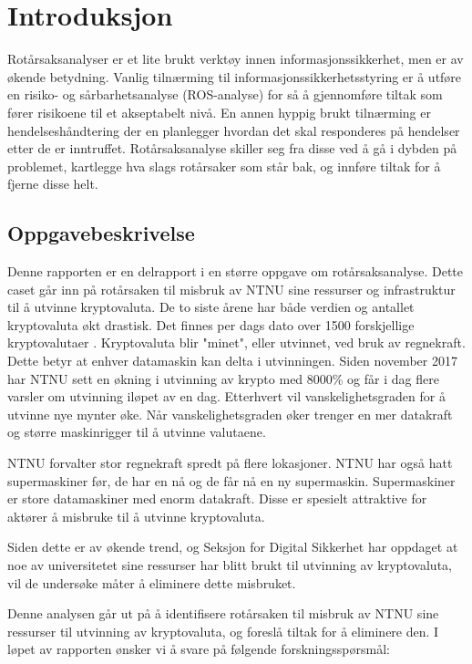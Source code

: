 \chapter{Introduksjon}
Rotårsaksanalyser er et lite brukt verktøy innen informasjonssikkerhet, men er av økende betydning. Vanlig tilnærming til informasjonssikkerhetsstyring er å utføre en risiko- og sårbarhetsanalyse (ROS-analyse) for så å gjennomføre tiltak som fører risikoene til et akseptabelt nivå. En annen hyppig brukt tilnærming er hendelseshåndtering der en planlegger hvordan det skal responderes på hendelser etter de er inntruffet. Rotårsaksanalyse skiller seg fra disse ved å gå i dybden på problemet, kartlegge hva slags rotårsaker som står bak, og innføre tiltak for å fjerne disse helt.

\section{Oppgavebeskrivelse}
Denne rapporten er en delrapport i en større oppgave om rotårsaksanalyse. Dette caset går inn på rotårsaken til misbruk av NTNU sine ressurser og infrastruktur til å utvinne kryptovaluta. De to siste årene har både verdien og antallet kryptovaluta økt drastisk. Det finnes per dags dato over 1500 forskjellige kryptovalutaer \cite{Cryptocurrency}. Kryptovaluta blir "minet", eller utvinnet, ved bruk av regnekraft. Dette betyr at enhver datamaskin kan delta i utvinningen. Siden november 2017 har NTNU sett en økning i utvinning av krypto med 8000\% og får i dag flere varsler om utvinning iløpet av en dag.  Etterhvert vil vanskelighetsgraden for å utvinne nye mynter øke. Når vanskelighetsgraden øker trenger en mer datakraft og større maskinrigger til å utvinne valutaene. 

NTNU forvalter stor regnekraft spredt på flere lokasjoner. NTNU har også hatt supermaskiner før, de har en nå og de får nå en ny supermaskin. Supermaskiner er store datamaskiner med enorm datakraft. Disse er spesielt attraktive for aktører å misbruke til å utvinne kryptovaluta. 

Siden dette er av økende trend, og Seksjon for Digital Sikkerhet har oppdaget at noe av universitetet sine ressurser har blitt brukt til utvinning av kryptovaluta, vil de undersøke måter å eliminere dette misbruket. 

Denne analysen går ut på å identifisere rotårsaken til misbruk av NTNU sine ressurser til utvinning av kryptovaluta, og foreslå tiltak for å eliminere den. I løpet av rapporten ønsker vi å svare på følgende forskningsspørsmål:

